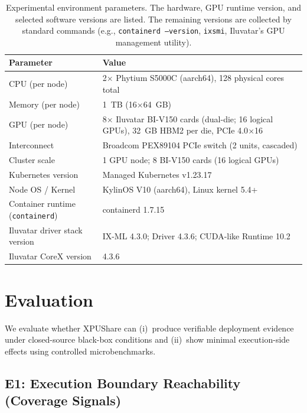 \documentclass[runningheads,a4paper]{llncs}
\begin{document}
\begin{table}[t]
\caption{Experimental environment parameters. The hardware, GPU runtime version, and selected software versions are listed. The remaining versions
are collected by standard commands (e.g., \texttt{containerd --version},
\texttt{ixsmi}, Iluvatar's GPU management utility).}
\label{tab:env}
\centering
\begin{tabular}{p{}p{}}
\toprule
\textbf{Parameter} & \textbf{Value} \\
\midrule
CPU (per node)              & 2$\times$ Phytium S5000C (aarch64), 128 physical cores total \\
Memory (per node)           & 1~TB (16$\times$64~GB) \\
GPU (per node)              & 8$\times$ Iluvatar BI-V150 cards (dual-die; 16 logical GPUs), 32~GB HBM2 per die, PCIe 4.0$\times$16 \\
Interconnect                & Broadcom PEX89104 PCIe switch (2 units, cascaded) \\
Cluster scale               & 1 GPU node; 8 BI-V150 cards (16 logical GPUs) \\
Kubernetes version    & Managed Kubernetes v1.23.17 \\
Node OS / Kernel            & KylinOS V10 (aarch64), Linux kernel 5.4+ \\
Container runtime (\texttt{containerd}) & containerd 1.7.15 \\
Iluvatar driver stack version  & IX-ML 4.3.0; Driver 4.3.6; CUDA-like Runtime 10.2 \\
Iluvatar CoreX version      & 4.3.6 \\
\bottomrule
\end{tabular}
\end{table}

\section{Evaluation}
\label{sec:eval}

We evaluate whether XPUShare can (i)~produce verifiable deployment evidence
under closed-source black-box conditions and (ii)~show minimal
execution-side effects using controlled microbenchmarks.

\subsection{E1: Execution Boundary Reachability (Coverage Signals)}
\label{sec:eval-e1}
\end{document}
